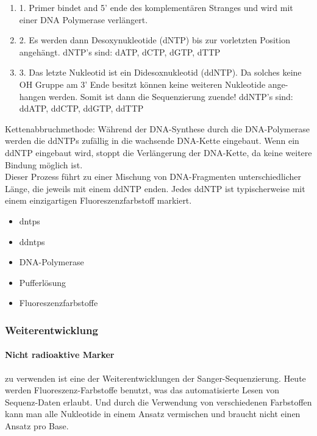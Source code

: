 \begin{mechanism}[title=Wie ist der Ablauf von Sanger Sequencing?]
\begin{enumerate}
    \item 1. Primer bindet and 5’ ende des komplementären Stranges und wird mit
einer DNA Polymerase verlängert.
\item 2. Es werden dann Desoxynukleotide (dNTP) bis zur vorletzten Position
angehängt.
dNTP’s sind: dATP, dCTP, dGTP, dTTP
\item 3. Das letzte Nukleotid ist ein Didesoxnukleotid (ddNTP). Da solches keine
OH Gruppe am 3’ Ende besitzt können keine weiteren Nukleotide ange-
hangen werden. Somit ist dann die Sequenzierung zuende!
ddNTP’s sind: ddATP, ddCTP, ddGTP, ddTTP
\end{enumerate}
\end{mechanism}
\begin{mechanism}[title=Prinzip der Sanger Sequenzierung und seiner Nachweis- u. Detektionsmethoden?]
Kettenabbruchmethode: Während der DNA-Synthese durch die DNA-Polymerase werden die ddNTPs zufällig in die wachsende DNA-Kette eingebaut. Wenn ein ddNTP eingebaut wird, stoppt die Verlängerung der DNA-Kette, da keine weitere Bindung möglich ist. \\ Dieser Prozess führt zu einer Mischung von DNA-Fragmenten unterschiedlicher Länge, die jeweils mit einem ddNTP enden. Jedes ddNTP ist typischerweise mit einem einzigartigen Fluoreszenzfarbstoff markiert.
\end{mechanism}
\begin{mechanism}[title=Wichtige Komponenten und Enzyme der Sanger-Sequenzierung]
\begin{itemize}
    \item \glspl{dntp}
    \item \glspl{ddntp}
    \item DNA-\gls{Polymerase}
    \item Pufferlösung
    \item Fluoreszenzfarbstoffe
\end{itemize}
\end{mechanism}

\subsubsection{Weiterentwicklung}

\paragraph{Nicht radioaktive Marker} zu verwenden ist eine der Weiterentwicklungen der Sanger-Sequenzierung. Heute werden Fluoreszenz-Farbstoffe benutzt, was das automatisierte Lesen von Sequenz-Daten erlaubt. Und durch die Verwendung von verschiedenen Farbstoffen kann man alle Nukleotide in einem Ansatz vermischen und braucht nicht einen Ansatz pro Base.  

